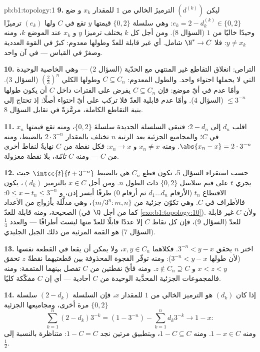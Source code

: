 \begin{solution}{pb:b1:topology:1}
\textbf{9.} ليكن $(d^{(k)})$ الترميزَ الخالي من $1$ للمقدار $x_k$ و
ضع $e_k = 2 - d^{(k)}_k \in \{0, 2\}$: وهي سلسلة $\{0,2\}$
قيمتها $y$ تقع في $C$ ولها $(e_k)$ ترميزًا وحيدًا خاليًا من
$1$ (السؤال 8). ومن أجل كل $k$ يختلف ترميزا $y$ و $x_k$
عند الموضع $k$، ومنه $y \neq x_k$: فلا  $\N^* \to C$
شامل. أي  غير قابلة للعدّ وطولها معدوم: كبرٌ في
القوة العددية وصغرٌ في القياس --- في آن واحد.

\textbf{10.} التراص: انغلاق التقاطع غير المنتهي
مع الحدّية (السؤال 2) --- وهي الخاصية الوحيدة
التي لا يحملها احتواء واحد. والطول المعدوم: $C \subseteq
C_n$ وطولها الكلي $(\frac23)^n$ (السؤال 3). وأمّا عدم
 في أيّ موضع: فإن $C \subseteq C_n$ يفرض على الفترات داخل $C$ أن يكون
طولها $\leq 3^{-n}$ (السؤال 4). وأمّا عدم قابلية العدّ فلا تركب على أيّ
احتواء أصلًا: إذ تحتاج إلى بنية التقاطع الكاملة،
مرمَّزةً في تقابل السؤال 8.

\textbf{11.} اقلب $d_n$ إلى $2 - d_n$: فتبقى السلسلة الجديدة
سلسلةَ $\{0,2\}$، ومنه تقع قيمتها $x_n$ في $C$؛ والمجاميع
الجزئية بعد الرتبة $n$ تختلف بالمقدار $2\cdot3^{-n}$ بالضبط، ومنه
$\abs{x_n - x} = 2\cdot3^{-n}$. ومنه $x_n \neq x$ و $x_n \to
x$: فكل نقطة من $C$ نهايةٌ لنقاط أخرى من $C$ --- ومنه  $C$
\emph{تامّة}، بلا نقطة معزولة.

\textbf{12.} حسب استقراء السؤال 5، تكون قطع
$C_n$ هي بالضبط $\intcc{t}{t + 3^{-n}}$ حيث يجري $t$
على قيم سلاسل $\{0,2\}$ ذات الطول $n$. ومن أجل $x \in C$
بالترميز $(d_k)$، يكون الاقتطاع $t_n$ (الأرقام $d_1 \dots d_n$
ثم أرقام $0$) طرفًا أيسر إذن، و $0 \leq x - t_n
\leq 3^{-n}$: فالأطراف  في $C$. وهي تكوّن  جزئية من
$\{m/3^n : m, n\}$، وهي  مدلَّلة بأزواج من الأعداد الصحيحة، ومنه
قابلة للعدّ (كما من أجل $\Q$ في \cref{exo:b1:topology:10}). ولأن $C$
غير قابلة للعدّ (السؤال 9)، فإن كل نقاط $C$ إلا عددًا قابلًا للعدّ منها
ليست أطرافًا --- والعدد $\frac14$ (السؤال 7) هو القمة المرئية
من ذلك الجبل الجليدي.

\textbf{13.} اختر $n$ يحقق $3^{-n} < y - x$. فكلاهما $x, y \in
C_n$، ولا يمكن أن يقعا في القطعة نفسها (لأن طولها $3^{-n} <
y - x$): ومنه توفّر الفجوة المحذوفة بين قطعتيهما نقطةً $z$
تحقق $x < z < y$ و $z \notin C_n \supseteq C$. ومنه فأيّ نقطتين
من $C$ تفصل بينهما المتممة: ومنه فالمجموعات الجزئية المحدَّبة الوحيدة
من $C$ أحادية --- أي إن $C$ مفكّكة كليًا.

\textbf{14.} إذا كان $(d_k)$ هو الترميز الخالي من $1$ للمقدار $x$، فإن السلسلة
$(2 - d_k)$ سلسلة $\{0,2\}$ مرة أخرى، ومجاميعها الجزئية
\[
\sum_{k=1}^{n} (2 - d_k)3^{-k} = (1 - 3^{-n}) - \sum_{k=1}^n
d_k 3^{-k} \longrightarrow 1 - x :
\]
ومنه $1 - x \in C$. ومنه $1 - C \subseteq C$، وبتطبيق 
مرتين نجد $1 - C = C$:  متناظرة بالنسبة إلى
$\frac12$.


\end{solution}
